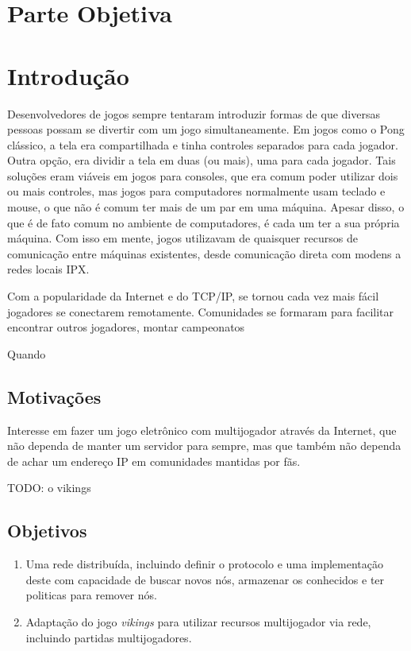 \chapter*{Parte Objetiva}
\label{sec:parte_objetiva}
\chapter{Introdução}
\label{sec:intr}

Desenvolvedores de jogos sempre tentaram introduzir formas de que diversas
pessoas possam se divertir com um jogo simultaneamente. Em jogos como o Pong
clássico, a tela era compartilhada e tinha controles separados para cada
jogador. Outra opção, era dividir a tela em duas (ou mais), uma para cada
jogador. Tais soluções eram viáveis em jogos para consoles, que era comum poder
utilizar dois ou mais controles, mas jogos para computadores normalmente usam
teclado e mouse, o que não é comum ter mais de um par em uma máquina.
Apesar disso, o que é de fato comum no ambiente de computadores, é cada um ter
a sua própria máquina. Com isso em mente, jogos utilizavam de quaisquer recursos
de comunicação entre máquinas existentes, desde comunicação direta com modens
a redes locais IPX.

Com a popularidade da Internet e do TCP/IP, se tornou cada vez mais fácil
jogadores se conectarem remotamente. Comunidades se formaram para facilitar
encontrar outros jogadores, montar campeonatos

Quando 

\section{Motivações}
\label{sec:intr:motivacoes}

Interesse em fazer um jogo eletrônico com multijogador através da Internet, que não dependa de manter um servidor para sempre, mas que também não dependa de achar um endereço IP em comunidades mantidas por fãs.

TODO: o vikings

\section{Objetivos}
\label{sec:intr:objetivos}

\begin{enumerate}
  \item Uma rede distribuída, incluindo definir o protocolo e uma implementação deste com capacidade de 
    buscar novos nós, armazenar os conhecidos e ter politicas para remover nós.
    
  \item Adaptação do jogo \textit{vikings} para utilizar recursos multijogador via rede, incluindo partidas
    multijogadores.
\end{enumerate}





